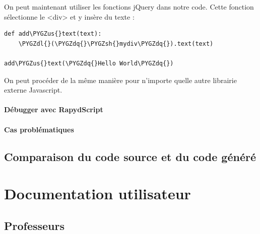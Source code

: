 \documentclass[a4,10pt,french]{sphinxmanual}
\def\PYGZus{\char`\_}
\def\PYGZsh{\char`\#}
\def\PYGZdl{\char`\$}
\def\PYGZdq{\char`\"}
\begin{document}
On peut maintenant utiliser les fonctions jQuery dans notre code. Cette fonction sélectionne le \textless{}div\textgreater{} et y insère du texte :

\begin{Verbatim}[commandchars=\\\{\}]
def add\PYGZus{}text(text):
    \PYGZdl{}(\PYGZdq{}\PYGZsh{}mydiv\PYGZdq{}).text(text)

add\PYGZus{}text(\PYGZdq{}Hello World\PYGZdq{})
\end{Verbatim}

On peut procéder de la même manière pour n'importe quelle autre librairie externe Javascript.


\subsubsection{Débugger avec RapydScript}
\label{rapydscript:debugger-avec-rapydscript}

\subsubsection{Cas problématiques}
\label{rapydscript:cas-problematiques}

\section{Comparaison du code source et du code généré}
\label{rapydscript:comparaison-du-code-source-et-du-code-genere}

\chapter{Documentation utilisateur}
\label{doc-user:documentation-utilisateur}\label{doc-user::doc}

\section{Professeurs}
\label{doc-user:professeurs}
\end{document}
